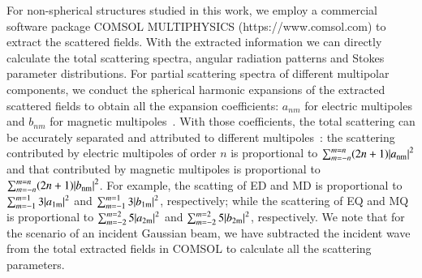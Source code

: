 \documentclass[aps,twocolumn,superscriptaddress]{revtex4-1}
\begin{document}
For non-spherical structures studied in this work, we employ a commercial software package COMSOL MULTIPHYSICS (https://www.comsol.com) to extract the scattered fields. With the extracted information we can directly calculate the total scattering spectra, angular radiation patterns and Stokes parameter distributions. For partial scattering spectra of different multipolar components, we conduct the spherical harmonic expansions of the extracted scattered fields to obtain all the expansion coefficients:  $a_{nm}$ for electric multipoles and $b_{nm}$ for magnetic multipoles~\cite{GRAHN_NewJ.Phys._electromagnetic_2012}. With those coefficients, the total scattering can be accurately separated and attributed to different multipoles~\cite{CHEN_2019_LaserPhotonicsRev._Multipolara}: the scattering contributed by electric multipoles of order $n$ is proportional to ${\sum\nolimits_{m=-n}^{m=n} (2n+1){|{a_{\rm{nm}}}|} ^2}$ and that contributed by magnetic multipoles is proportional to ${\sum\nolimits_{m=-n}^{m=n} (2n+1) {|{b_{\rm{nm}}}|} ^2}$. For example, the scatting of ED and MD is proportional to ${\sum\nolimits_{m=-1}^{m=1} 3{|{a_{\rm{1m}}}|} ^2}$ and ${\sum\nolimits_{m=-1}^{m=1} 3{|{b_{\rm{1m}}}|} ^2}$, respectively; while the scattering of EQ and MQ is proportional to ${\sum\nolimits_{m=-2}^{m=2} 5{|{a_{\rm{2m}}}|} ^2}$ and ${\sum\nolimits_{m=-2}^{m=2} 5{|{b_{\rm{2m}}}|} ^2}$, respectively.  We note that for the scenario of an incident Gaussian beam, we have subtracted the incident wave from the total extracted fields in COMSOL to calculate all the scattering parameters.




%
\end{document}

